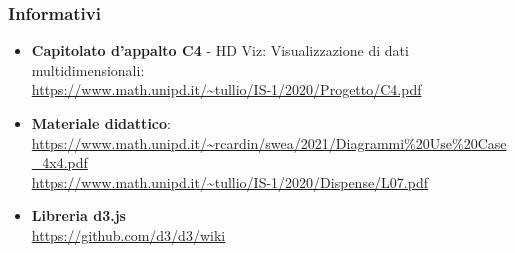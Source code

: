     \subsubsection{Informativi}
    \begin{itemize}
        \item \textbf{Capitolato d'appalto C4} - HD Viz: Visualizzazione di dati multidimensionali:\\\url{https://www.math.unipd.it/~tullio/IS-1/2020/Progetto/C4.pdf}
        \item \textbf{Materiale didattico}: \\\url{https://www.math.unipd.it/~rcardin/swea/2021/Diagrammi%20Use%20Case_4x4.pdf}
        \\\url{https://www.math.unipd.it/~tullio/IS-1/2020/Dispense/L07.pdf}
        \item \textbf{Libreria d3.js}
        \\\url{https://github.com/d3/d3/wiki}
    \end{itemize}